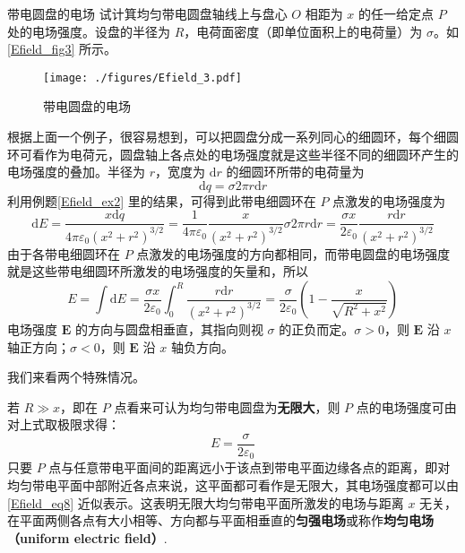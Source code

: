  
\begin{example}{带电圆盘的电场}\label{Efield_ex3}
试计箕均匀带电圆盘轴线上与盘心 $O$ 相距为 $x$ 的任一给定点 $P$ 处的电场强度。设盘的半径为 $R$，电荷面密度（即单位面积上的电荷量）为 $\sigma$。如\autoref{Efield_fig3} 所示。

\begin{figure}[ht]
\centering
\texttt{[image: ./figures/Efield\_3.pdf]}
\caption{带电圆盘的电场} \label{Efield_fig3}
\end{figure}

根据上面一个例子，很容易想到，可以把圆盘分成一系列同心的细圆环，每个细圆环可看作为电荷元，圆盘轴上各点处的电场强度就是这些半径不同的细圆环产生的电场强度的叠加。半径为 $r$，宽度为 $\mathrm dr$ 的细圆环所带的电荷量为
\begin{equation}
\mathrm{d} q=\sigma 2 \pi r \mathrm{d} r
\end{equation}
利用例题\autoref{Efield_ex2} 里的结果，可得到此带电细圆环在 $P$ 点激发的电场强度为
\begin{equation}
\mathrm{d} E=\frac{x \mathrm{d} q}{4 \pi \varepsilon_{0}\left(x^{2}+r^{2}\right)^{3 / 2}}=\frac{1}{4 \pi \varepsilon_{0}} \frac{x}{\left(x^{2}+r^{2}\right)^{3 / 2}} \sigma 2 \pi r \mathrm{d} r=\frac{\sigma x}{2 \varepsilon_{0}} \frac{r \mathrm{d} r}{\left(x^{2}+r^{2}\right)^{3 / 2}}
\end{equation}
由于各带电细圆环在 $P$ 点激发的电场强度的方向都相同，而带电圆盘的电场强度就是这些带电细圆环所激发的电场强度的矢量和，所以
\begin{equation}\label{Efield_eq7}
E=\int \mathrm{d} E=\frac{\sigma x}{2 \varepsilon_{0}} \int_{0}^{R} \frac{r \mathrm{d} r}{\left(x^{2}+r^{2}\right)^{3 / 2}}=\frac{\sigma}{2 \varepsilon_{0}}\left(1-\frac{x}{\sqrt{R^{2}+x^{2}}}\right)
\end{equation}
电场强度 $\mathbf E$ 的方向与圆盘相垂直，其指向则视 $\sigma$ 的正负而定。$\sigma>0$，则 $\mathbf E$ 沿 $x$ 轴正方向；$\sigma<0$，则 $\mathbf E$ 沿 $x$ 轴负方向。

我们来看两个特殊情况。

若 $R\gg x$，即在 $P$ 点看来可认为均匀带电圆盘为\textbf{无限大}，则 $P$ 点的电场强度可由对上式取极限求得：
\begin{equation} \label{Efield_eq8}
E=\frac{\sigma}{2 \varepsilon_{0}}
\end{equation}
只要 $P$ 点与任意带电平面间的距离远小于该点到带电平面边缘各点的距离，即对均匀带电平面中部附近各点来说，这平面都可看作是无限大，其电场强度都可以由\autoref{Efield_eq8} 近似表示。这表明无限大均匀带电平面所激发的电场与距离 $x$ 无关，在平面两侧各点有大小相等、方向都与平面相垂直的\textbf{匀强电场}或称作\textbf{均匀电场（uniform electric field）}.


\end{example}
